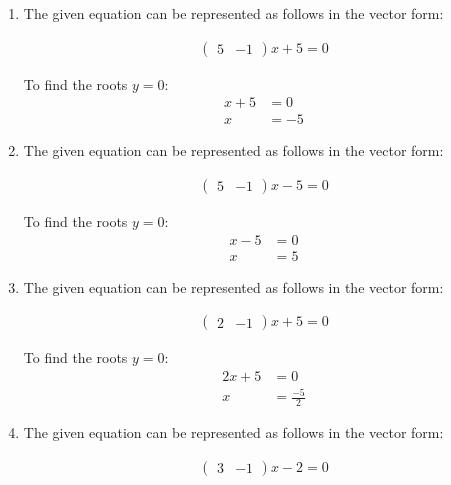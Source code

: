 
\renewcommand{\theequation}{\theenumi}
\begin{enumerate}[label=\thesection.\arabic*.,ref=\thesection.\theenumi]

\item \solution 
\begin{flushleft}
The given equation can be represented as follows in the vector form:
\end{flushleft}
\begin{align}
\begin{pmatrix}
5 & -1 
\end{pmatrix}
x + 5 = 0
\end{align}

To find the roots $y=0$:
\begin{align}
x + 5 &= 0 \\
x &= -5
\end{align}

\item \solution 
\begin{flushleft}
The given equation can be represented as follows in the vector form:
\end{flushleft}
\begin{align}
\begin{pmatrix}
5 & -1 
\end{pmatrix}
x - 5 = 0
\end{align}

To find the roots $y=0$:
\begin{align}
x - 5 &= 0 \\
x &= 5
\end{align}

\item \solution 
\begin{flushleft}
The given equation can be represented as follows in the vector form:
\end{flushleft}
\begin{align}
\begin{pmatrix}
2 & -1 
\end{pmatrix}
x + 5 = 0
\end{align}

To find the roots $y=0$:
\begin{align}
2x + 5 &= 0 \\
x &= \frac{-5}{2}
\end{align}

\item \solution 
\begin{flushleft}
The given equation can be represented as follows in the vector form:
\end{flushleft}
\begin{align}
\begin{pmatrix}
3 & -1 
\end{pmatrix}
x - 2 = 0
\end{align}


\end{enumerate}
